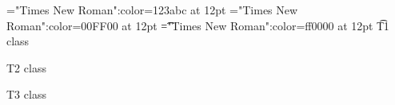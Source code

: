 \font\wzt="Times New Roman":color=123abc at 12pt
\font\zt="Times New Roman":color=00FF00 at 12pt
\font\t="Times New Roman":color=ff0000 at 12pt
\t T1 class 

\zt T2 class 

\wzt T3 class 


\bye
